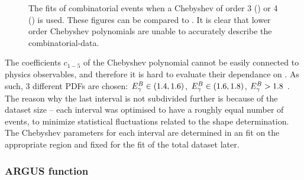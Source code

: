 \begin{figure}[htbp!]
    \caption{\label{fig:lower_order_chebyshev}The \Mbc fits of combinatorial \BB events when a Chebyshev \PDF of order 3 () or 4 () is used.
    These figures can be compared to .
    It is clear that lower order Chebyshev polynomials are unable to accurately describe the combinatorial-\BB data.
    }
\end{figure}


The coefficients $c_{1-5}$ of the Chebyshev polynomial cannot be easily connected to physics observables,
and therefore it is hard to evaluate their dependance on \EB.
As such, 3 different PDFs are chosen: ${E^B_{\gamma}}\in(1.4,1.6)$, ${E^B_{\gamma}}\in(1.6,1.8)$, ${E^B_{\gamma}}>1.8$ \gev.
The reason why the last interval is not subdivided further is because of the dataset size -- each interval was optimised to have a roughly equal number of events, to minimize statistical fluctuations related to the shape determination.
The Chebyshev \PDF parameters for each interval are determined in an \Mbc fit on the appropriate region and fixed for the fit of the total dataset later.

\subsubsection{ARGUS function}\label{sec:argus_prefit}
